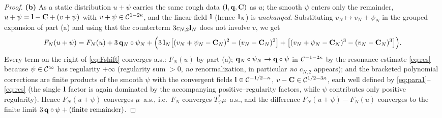 \begin{proof}
\medskip
\textbf{(b)} As a static distribution $u+\psi$ carries the same rough data
$(\mathbf{l},\mathbf{q},\mathbf{C})$ as $u$; the smooth $\psi$ enters only the remainder,
$u+\psi=\mathbf{l}-\mathbf{C}+(v+\psi)$ with $v+\psi\in\mathcal{C}^{1-2\kappa}$, and the linear
field $\mathbf{l}$ (hence $\mathbf{l}_N$) is \emph{unchanged}. Substituting
$v_N\mapsto v_N+\psi_N$ in the grouped expansion of part (a) and using that the
counterterm $3c_{N,2}\mathbf{l}_N$ does not involve $v$, we get
\begin{equation}\label{eq:Fshift}
F_N(u+\psi)=F_N(u)+3\,\mathbf{q}_N\circ\psi_N
+\Bigl(3\,\mathbf{l}_N\bigl[(v_N+\psi_N-\mathbf{C}_N)^2-(v_N-\mathbf{C}_N)^2\bigr]
+\bigl[(v_N+\psi_N-\mathbf{C}_N)^3-(v_N-\mathbf{C}_N)^3\bigr]\Bigr).
\end{equation}
Every term on the right of \eqref{eq:Fshift} converges a.s.: $F_N(u)$ by part (a);
$\mathbf{q}_N\circ\psi_N\to\mathbf{q}\circ\psi$ in $\mathcal{C}^{-1-2\kappa}$ by the resonance
estimate \eqref{eq:res} because $\psi\in\mathcal{C}^\infty$ has regularity $+\infty$
(regularity sum $>0$, \emph{no} renormalization, in particular \emph{no} $c_{N,2}$
appears); and the bracketed polynomial corrections are finite products of the smooth
$\psi$ with the convergent fields $\mathbf{l}\in\mathcal{C}^{-1/2-\kappa}$,
$v-\mathbf{C}\in\mathcal{C}^{1/2-3\kappa}$, each well defined by
\eqref{eq:para1}--\eqref{eq:res} (the single $\mathbf{l}$ factor is again dominated by
the accompanying positive--regularity factors, while $\psi$ contributes only positive
regularity). Hence $F_N(u+\psi)$ converges $\mu$--a.s., i.e.\ $F_N$ converges
$T_\psi^*\mu$--a.s., and the difference $F_N(u+\psi)-F_N(u)$ converges to the finite
limit $3\,\mathbf{q}\circ\psi+(\text{finite remainder})$.
\end{proof}

